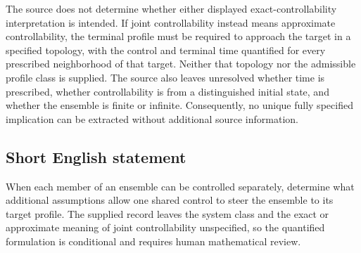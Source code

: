 \documentclass[11pt]{article}
\begin{document}
The source does not determine whether either displayed exact-controllability interpretation is intended. If joint controllability instead means approximate controllability, the terminal profile must be required to approach the target in a specified topology, with the control and terminal time quantified for every prescribed neighborhood of that target. Neither that topology nor the admissible profile class is supplied. The source also leaves unresolved whether time is prescribed, whether controllability is from a distinguished initial state, and whether the ensemble is finite or infinite. Consequently, no unique fully specified implication can be extracted without additional source information.
\subsection{Short English statement}
When each member of an ensemble can be controlled separately, determine what additional assumptions allow one shared control to steer the ensemble to its target profile. The supplied record leaves the system class and the exact or approximate meaning of joint controllability unspecified, so the quantified formulation is conditional and requires human mathematical review.
\end{document}
